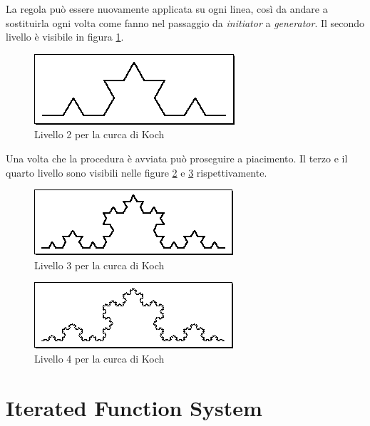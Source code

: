 \documentclass[11pt,a4paper]{scrreprt}
\begin{document}
La regola può essere nuovamente applicata su ogni linea, così da andare a sostituirla ogni volta come fanno nel passaggio da \textit{initiator} a \textit{generator}. Il secondo livello è visibile in figura \ref{fig:k2}.

\begin{figure}[!ht]
\centering
\includegraphics[scale=0.55]{images/koch2.png}
\caption{Livello 2 per la curca di Koch}
\label{fig:k2}
\end{figure}

\FloatBarrier

Una volta che la procedura è avviata può proseguire a piacimento. Il terzo e il quarto livello sono visibili nelle figure \ref{fig:k3} e \ref{fig:k4} rispettivamente.

\begin{figure}[!ht]
\centering
\includegraphics[scale=0.55]{images/koch3.png}
\caption{Livello 3 per la curca di Koch}
\label{fig:k3}
\end{figure}

\begin{figure}[!ht]
\centering
\includegraphics[scale=0.55]{images/koch4.png}
\caption{Livello 4 per la curca di Koch}
\label{fig:k4}
\end{figure}



\section{Iterated Function System}
\end{document}
